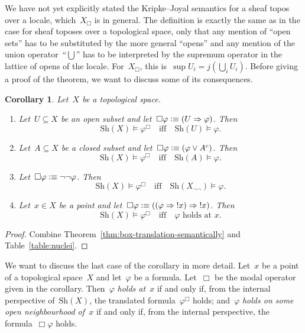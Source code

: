 \documentclass[10pt]{amsart}
\theoremstyle{definition}
\theoremstyle{plain}
\newtheorem{cor}[defn]{Corollary}
\theoremstyle{remark}
\newcommand{\Sh}{\mathrm{Sh}}
\newcommand{\?}{\,{:}\,}
\renewcommand{\_}{\mathpunct{.}\,}
\newcommand{\notat}[1]{{!#1}}
\newcommand{\defequiv}{\vcentcolon\equiv}
\begin{document}
We have not yet explicitly stated the Kripke--Joyal semantics for a sheaf topos
over a locale, which~$X_\Box$ is in general. The definition is exactly the same
as in the case for sheaf toposes over a topological space, only that any
mention of ``open sets'' has to be substituted by the more general ``opens''
and any mention of the union operator~``$\bigcup$'' has to be interpreted by
the supremum operator in the lattice of opens of the locale. For~$X_\Box$, this
is~$\sup U_i = j(\bigcup_i U_i)$. Before giving a proof of the theorem, we want
to discuss some of its consequences.

\begin{cor}\label{cor:spreading}
Let~$X$ be a topological space.
\begin{enumerate}
\item Let~$U \subseteq X$ be an open subset and let~$\Box\varphi \defequiv (U
\Rightarrow \varphi)$. Then
\[ \Sh(X) \models \varphi^\Box \quad\text{iff}\quad \Sh(U) \models \varphi. \]
\item Let~$A \subseteq X$ be a closed subset and let~$\Box\varphi \defequiv
(\varphi \vee A^c)$. Then
\[ \Sh(X) \models \varphi^\Box \quad\text{iff}\quad \Sh(A) \models \varphi. \]
\item Let~$\Box\varphi \defequiv \neg\neg\varphi$. Then
\[ \Sh(X) \models \varphi^\Box \quad\text{iff}\quad \Sh(X_{\neg\neg}) \models \varphi. \]
\item Let~$x \in X$ be a point and let~$\Box\varphi \defequiv ((\varphi
\Rightarrow \notat{x}) \Rightarrow \notat{x})$. Then
\[ \Sh(X) \models \varphi^\Box \quad\text{iff}\quad \text{$\varphi$ holds
at~$x$}. \]
\end{enumerate}
\end{cor}
\begin{proof}Combine Theorem~\ref{thm:box-translation-semantically} and
Table~\ref{table:nuclei}.\end{proof}

We want to discuss the last case of the corollary in more detail. Let~$x$ be a
point of a topological space~$X$ and let~$\varphi$ be a formula. Let~$\Box$ be
the modal operator given in the corollary. Then~$\varphi$ \emph{holds at~$x$}
if and only if, from the internal perspective of~$\Sh(X)$, the translated
formula~$\varphi^\Box$ holds; and~$\varphi$ \emph{holds on some open
neighbourhood of~$x$} if and only if, from the internal perspective, the
formula~$\Box\varphi$ holds.
\end{document}
